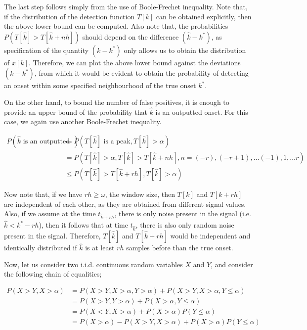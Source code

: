 \documentclass[10pt]{article}
\begin{document}
The last step follows simply from the use of Boole-Frechet inequality. Note that, if the distribution of the detection function $T[k]$ can be obtained explicitly, then the above lower bound can be computed. Also note that, the probabilities $P(T[\hat{k}] > T[\hat{k} + nh])$ should depend on the difference $(\hat{k}-k^*)$, as specification of the quantity $(k-k^*)$ only allows us to obtain the distribution of $x[k]$. Therefore, we can plot the above lower bound against the deviations $(k-k^*)$, from which it would be evident to obtain the probability of detecting an onset within some specified neighbourhood of the true onset $k^*$. 

On the other hand, to bound the number of false positives, it is enough to provide an upper bound of the probability that $\hat{k}$ is an outputted onset. For this case, we again use another Boole-Frechet inequality.

\begin{align*}
    P\left(\hat{k}\text{ is an outputted onset}\right) & = P\left(T[\hat{k}]\text{ is a peak}, T[\hat{k}] > \alpha\right)\\
    & = P\left(T[\hat{k}] > \alpha, T[\hat{k}] > T[\hat{k} + nh], n = (-r), (-r+1), \dots (-1), 1, \dots r\right)\\
    & \leq P(T[\hat{k}] > T[\hat{k} + rh], T[\hat{k}] > \alpha)
\end{align*}

Now note that, if we have $rh \geq \omega$, the window size, then $T[k]$ and $T[k+rh]$ are independent of each other, as they are obtained from different signal values. Also, if we assume at the time $t_{\hat{k}+ rh}$, there is only noise present in the signal (i.e. $\hat{k} < k^* - rh$), then it follows that at time $t_{\hat{k}}$, there is also only random noise present in the signal. Therefore, $T[\hat{k}]$ and $T[\hat{k}+rh]$ would be independent and identically distributed if $\hat{k}$ is at least $rh$ samples before than the true onset. 

Now, let us consider two i.i.d. continuous random variables $X$ and $Y$, and consider the following chain of equalities;

\begin{align*}
    P(X > Y, X> \alpha) & = P(X > Y, X > \alpha, Y > \alpha) + P(X > Y, X > \alpha, Y \leq \alpha)\\
    & = P(X > Y, Y > \alpha) + P(X > \alpha, Y \leq \alpha)\\
    & = P(X < Y, X > \alpha) + P(X > \alpha) P(Y\leq \alpha)\\
    & = P(X > \alpha) - P(X > Y, X> \alpha) + P(X > \alpha) P(Y\leq \alpha)
\end{align*}
\end{document}
